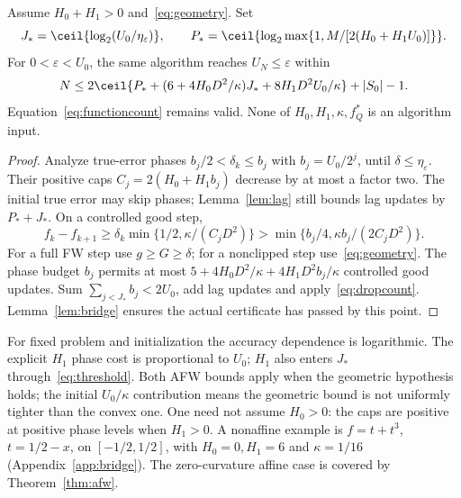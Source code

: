 \begin{theorem}\label{thm:geometric}
Assume $H_0+H_1>0$ and~\eqref{eq:geometry}. Set
\[
 J_*=\ceil{\log_2(U_0/\eta_\varepsilon)},\qquad
 P_*=\ceil{\log_2\max\{1,M/[2(H_0+H_1U_0)]\}}.
\]
For $0<\varepsilon<U_0$, the same algorithm reaches
$U_N\le\varepsilon$ within
\begin{equation}\label{eq:geometriccount}
 N\le2\ceil{P_*+(6+4H_0D^2/\kappa)J_*+8H_1D^2U_0/\kappa}
       +|S_0|-1.
\end{equation}
Equation~\eqref{eq:functioncount} remains valid. None of
$H_0,H_1,\kappa,f_Q^*$ is an algorithm input.
\end{theorem}
\begin{proof}
Analyze true-error phases $b_j/2<\delta_k\le b_j$ with
$b_j=U_0/2^j$, until $\delta\le\eta_\varepsilon$.
Their positive caps $C_j=2(H_0+H_1b_j)$ decrease by at most a factor
two. The initial true error may skip phases; Lemma~\ref{lem:lag}
still bounds lag updates by $P_*+J_*$.
On a controlled good step,
\[
 f_k-f_{k+1}\ge\delta_k\min\{1/2,\kappa/(C_jD^2)\}
 >\min\{b_j/4,\kappa b_j/(2C_jD^2)\}.
\]
For a full FW step use $g\ge G\ge\delta$; for a nonclipped step
use~\eqref{eq:geometry}. The phase budget $b_j$ permits at most
$5+4H_0D^2/\kappa+4H_1D^2b_j/\kappa$ controlled good updates.
Sum $\sum_{j<J_*}b_j<2U_0$, add lag updates and
apply~\eqref{eq:dropcount}. Lemma~\ref{lem:bridge} ensures the actual
certificate has passed by this point.
\end{proof}

For fixed problem and initialization the accuracy dependence is
logarithmic. The explicit $H_1$ phase cost is proportional to $U_0$;
$H_1$ also enters $J_*$ through~\eqref{eq:threshold}.
Both AFW bounds apply when the geometric hypothesis holds; the
initial $U_0/\kappa$ contribution means the geometric bound is not
uniformly tighter than the convex one.
One need not assume $H_0>0$: the caps are positive at positive phase
levels when $H_1>0$. A nonaffine example is $f=t+t^3$,
$t=1/2-x$, on $[-1/2,1/2]$, with $H_0=0,H_1=6$ and
$\kappa=1/16$ (Appendix~\ref{app:bridge}). The zero-curvature affine
case is covered by Theorem~\ref{thm:afw}.
